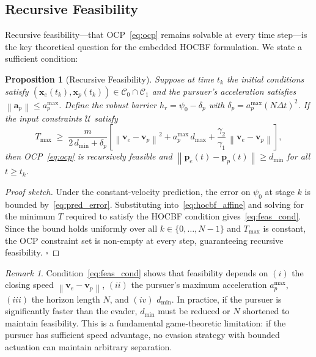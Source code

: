 \documentclass[lettersize,journal]{IEEEtran}
\newtheorem{proposition}{Proposition}
\theoremstyle{definition}
\theoremstyle{remark}
\newtheorem{remark}{Remark}
\newcommand{\norm}[1]{\left\| #1 \right\|}
\newcommand{\vect}[1]{\bm{#1}}
\begin{document}
\subsection{Recursive Feasibility}
\label{sec:feasibility}

Recursive feasibility---that OCP~\eqref{eq:ocp} remains solvable at
every time step---is the key theoretical question for the embedded
HOCBF formulation.
We state a sufficient condition:

\begin{proposition}[Recursive Feasibility]
\label{prop:feasibility}
Suppose at time $t_k$ the initial conditions satisfy
$(\vect{x}_e(t_k),\vect{x}_p(t_k))\in\mathcal{C}_0\cap\mathcal{C}_1$
and the pursuer's acceleration satisfies
$\norm{\vect{a}_p}\leq a_p^{\max}$.
Define the \emph{robust barrier} $h_r = \psi_0 - \delta_p$ with
$\delta_p = a_p^{\max}(N\Delta t)^2$.
If the input constraints $\mathcal{U}$ satisfy
\begin{equation}
    T_{\max}\;\geq\;
    \frac{m}{2\,d_{\min}+\delta_p}\!\left[
        \norm{\vect{v}_e-\vect{v}_p}^2
        + a_p^{\max}\,d_{\max}
        + \frac{\gamma_2}{\gamma_1}\,\norm{\vect{v}_e-\vect{v}_p}
    \right],
    \label{eq:feas_cond}
\end{equation}
then OCP~\eqref{eq:ocp} is recursively feasible and
$\norm{\vect{p}_e(t)-\vect{p}_p(t)}\geq d_{\min}$ for all $t \geq t_k$.
\end{proposition}

\begin{proof}[Proof sketch]
Under the constant-velocity prediction, the error on $\psi_0$ at stage
$k$ is bounded by~\eqref{eq:pred_error}.
Substituting into~\eqref{eq:hocbf_affine} and solving for the minimum
$T$ required to satisfy the HOCBF condition gives~\eqref{eq:feas_cond}.
Since the bound holds uniformly over all $k\in\{0,\ldots,N-1\}$ and
$T_{\max}$ is constant, the OCP constraint set is non-empty at every
step, guaranteeing recursive feasibility. $\square$
\end{proof}

\begin{remark}
Condition~\eqref{eq:feas_cond} shows that feasibility depends on
$(i)$ the closing speed $\norm{\vect{v}_e-\vect{v}_p}$,
$(ii)$ the pursuer's maximum acceleration $a_p^{\max}$,
$(iii)$ the horizon length $N$, and $(iv)$ $d_{\min}$.
In practice, if the pursuer is significantly faster than the evader,
$d_{\min}$ must be reduced or $N$ shortened to maintain feasibility.
This is a fundamental game-theoretic limitation: if the pursuer has
sufficient speed advantage, no evasion strategy with bounded
actuation can maintain arbitrary separation.
\end{remark}
\end{document}
